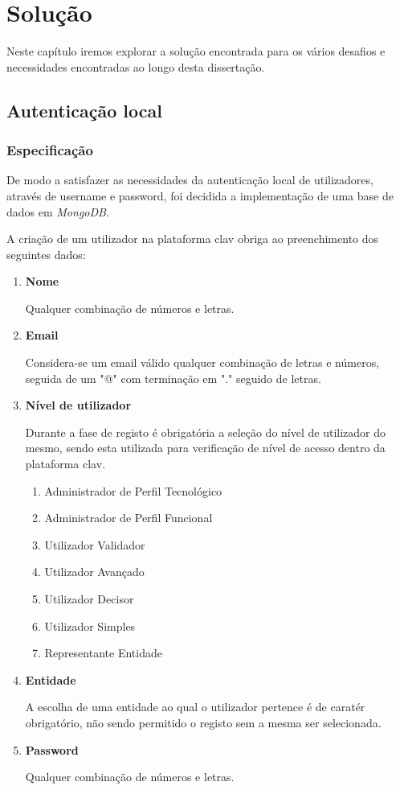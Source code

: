 \cleardoublepage
\chapter{Solução}

Neste capítulo iremos explorar a solução encontrada para os vários desafios e necessidades encontradas ao longo desta dissertação.

\section{Autenticação local}

\subsection{Especificação}

De modo a satisfazer as necessidades da autenticação local de utilizadores, através de username e password, foi decidida a implementação de uma base de dados em \emph{MongoDB}.

A criação de um utilizador na plataforma \gls{clav} obriga ao preenchimento dos seguintes dados:

\begin{enumerate}
    \item \textbf{Nome}
    
        Qualquer combinação de números e letras.
    \item \textbf{Email}
    
        Considera-se um email válido qualquer combinação de letras e números, seguida de um "@" com terminação em "." seguido de letras.
    \item \textbf{Nível de utilizador}
    
        Durante a fase de registo é obrigatória a seleção do nível de utilizador do mesmo, sendo esta utilizada para verificação de nível de acesso dentro da plataforma \gls{clav}.
    \begin{enumerate}
        \item Administrador de Perfil Tecnológico
        \item Administrador de Perfil Funcional
        \item Utilizador Validador
        \item Utilizador Avançado
        \item Utilizador Decisor
        \item Utilizador Simples
        \item Representante Entidade
    \end{enumerate}
    \item \textbf{Entidade}
    
        A escolha de uma entidade ao qual o utilizador pertence é de caratér obrigatório, não sendo permitido o registo sem a mesma ser selecionada.
    \item \textbf{Password}
    
        Qualquer combinação de números e letras.
\end{enumerate}


